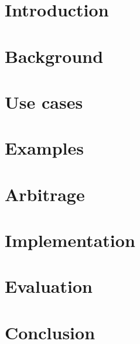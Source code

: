 


\begin{abstract}
    
\end{abstract}

\section{Introduction}\label{intro}


\section{Background}\label{back}


\section{Use cases}\label{use}


\section{Examples}\label{ex}


\section{Arbitrage}\label{arb}


\section{Implementation}\label{imp}


\section{Evaluation}\label{eval}


\section{Conclusion}\label{con}


\newpage
\printbibliography

